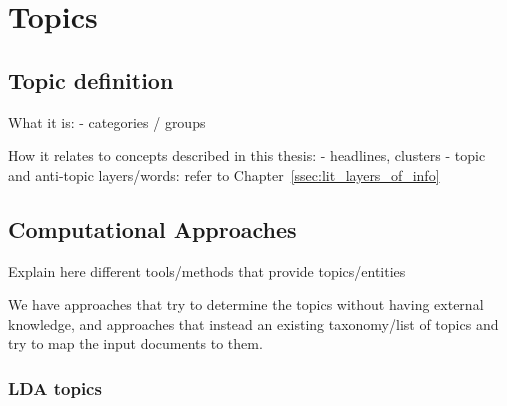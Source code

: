 









\section{\statusred Topics}
\label{sec:lit_topics}

\subsection{Topic definition}
\label{sec:lit_topics_def}

What it is:
- categories / groups 

How it relates to concepts described in this thesis:
- headlines, clusters
- topic and anti-topic layers/words: refer to Chapter~\ref{ssec:lit_layers_of_info}

\subsection{Computational Approaches}
\label{sec:lit_topics_computation}


Explain here different tools/methods that provide topics/entities

We have approaches that try to determine the topics without having external knowledge, and approaches that instead an existing taxonomy/list of topics and try to map the input documents to them.

\subsubsection{LDA topics}

